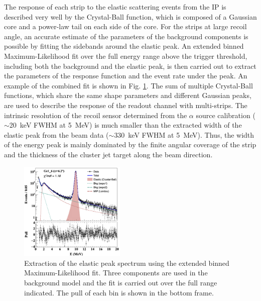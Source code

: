 \documentclass[number,5p]{elsarticle}
\begin{document}
The response of each strip to the elastic scattering events from the IP is described
very well by the Crystal-Ball function\cite{crystal_ball}, which is composed of a Gaussian core and a power-law tail on each side of the core.
For the strips at large recoil angle, an accurate estimate of the parameters of
the background components is possible by fitting the sidebands around the elastic peak.
An extended binned Maximum-Likelihood fit over the full energy range above the
trigger threshold, including both the background and the
elastic peak, is then carried out to extract the parameters of the response function and the event rate under the peak.
An example of the combined fit is shown in Fig. \ref{fig:e_fit}.
The sum of multiple Crystal-Ball functions, which share the same shape parameters and
different Gaussian peaks, are used to describe the response of the readout channel with multi-strips. 
The intrinsic resolution of the recoil sensor determined from the $\alpha$ source
calibration ($\sim$\SI{20}{\keV} FWHM at \SI{5}{\MeV}) is much smaller than the
extracted width of the elastic peak from the beam data ($\sim$\SI{330}{\keV}
FWHM at \SI{5}{\MeV}).
Thus, the width of the energy peak is mainly dominated by the finite
angular coverage of the strip and the thickness of the cluster jet target along the beam direction.
\begin{figure}[h!]
  \centering
  \includegraphics[width=0.45\textwidth]{./e_fit.png}
  \caption{Extraction of the elastic peak spectrum using the extended binned
    Maximum-Likelihood fit. Three components are used in the background model
    and the fit is carried out over the full range indicated. The pull of each bin
    is shown in the bottom frame.}
  \label{fig:e_fit}
\end{figure}
\end{document}
